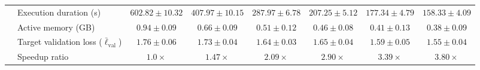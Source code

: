 \documentclass[11pt,a4paper]{article}
\begin{document}
\begin{table}[h]
{\begin{tabular}{|l|l|c|c|c|c|c|c|}
                                                     & Execution duration (s)            & $602.82 \pm 10.32$                & $407.97 \pm 10.15$                & $287.97 \pm 6.78$                 & $207.25 \pm 5.12$                 & $177.34 \pm 4.79$                 & $158.33 \pm 4.09$                 \\ \cline{2-8}
                                                     & Active memory (GB)                & $0.94 \pm 0.09$                   & $0.66 \pm 0.09$                   & $0.51 \pm 0.12$                   & $0.46 \pm 0.08$                   & $0.41 \pm 0.13$                   & $0.38 \pm 0.09$                   \\ \cline{2-8}
                                                     & Target validation loss ($\bar{\ell}_{\mathrm{val}}$)                   & $1.76 \pm 0.06$                   & $1.73 \pm 0.04$                   & $1.64 \pm 0.03$                   & $1.65 \pm 0.04$                   & $1.59 \pm 0.05$                   & $1.55 \pm 0.04$                   \\ \cline{2-8}
                                                     & Speedup ratio                     & $1.0\times$                       & $1.47\times$                      & $2.09\times$                      & $2.90\times$                      & $3.39\times$                      & $3.80\times$                      \\ \hline
\end{tabular}
}
\end{table}

\begin{table}[h]
\centering
\caption{Cross-Attention Multi-GPU Parallel Performance metrics.}
\label{tab:gpu_performance}
\end{table}
\end{document}
